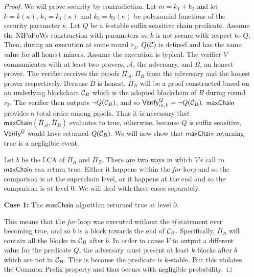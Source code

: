\begin{proof}
    We will prove security by contradiction.  Let $m = k_1 + k_2$ and let $k =
    k(\kappa)$, $k_1 = k_1(\kappa)$ and $k_2 = k_2(\kappa)$ be polynomial
    functions of the security parameter $\kappa$.  Let $Q$ be a $k$-stable
    suffix sensitive chain predicate. Assume the NIPoPoWs construction with
    parameters $m, k$ is not secure with respect to $Q$. Then, during an
    execution at some round $r_3$, $Q(\mathcal{C})$ is defined and has the same
    value for all honest miners.  Assume the execution is typical. The verifier
    $V$ communicates with at least two provers, $\mathcal{A}$, the adversary,
    and $B$, an honest prover.  The verifier receives the proofs
    $\overline{\Pi}_\mathcal{A}, \overline{\Pi}_B$ from the adversary and the
    honest prover respectively.  Because $B$ is honest, $\overline{\Pi}_B$ will
    be a proof constructed based on an underlying blockchain $\mathcal{C}_B$ which
    is the adopted blockchain of $B$ during round $r_3$. The verifier then
    outputs $\lnot Q(\mathcal{C}_B)$, and so $\textsf{Verify}^Q_{m,k} = \lnot Q(\mathcal{C}_B)$.
    $\textsf{maxChain}$ provides a total order among proofs.  Thus it is
    necessary that $\textsf{maxChain}(\overline{\Pi}_\mathcal{A},
    \overline{\Pi}_B)$ evaluates to true, otherwise, because $Q$ is suffix
    sensitive, $\textsf{Verify}^Q$ would have returned $Q(\mathcal{C}_B)$. We will
    now show that $\textsf{maxChain}$ returning true is a negligible event.

    Let $b$ be the LCA of $\overline{\Pi}_A$ and $\overline{\Pi}_B$.  There are
    two ways in which $V$'s call to $\textsf{maxChain}$ can return true. Either
    it happens within the \textit{for} loop and so the comparison is at the
    superchain level, or it happens at the end and so the comparison is at
    level $0$. We will deal with these cases separately.

    \textbf{Case 1:} The $\textsf{maxChain}$ algorithm returned true at level
    $0$.

    This means that the \textit{for} loop was executed without the \textit{if}
    statement ever becoming true, and so $b$ is a block towards the end of
    $\mathcal{C}_B$. Specifically, $\overline{\Pi}_B$ will contain all the blocks in
    $\mathcal{C}_B$ after $b$. In order to cause $V$ to output a different value for
    the predicate $Q$, the adversary must present at least $k$ blocks after $b$
    which are not in $\mathcal{C}_B$. This is because the predicate is $k$-stable.
    But this violates the Common Prefix property and thus occurs with
    negligible probability.


\end{proof}

